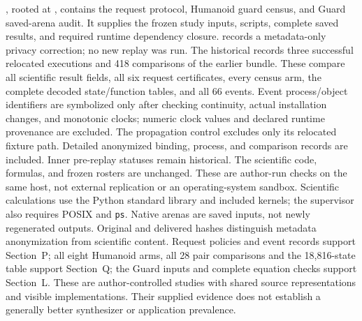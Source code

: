 , rooted at
, contains the request protocol,
Humanoid guard census, and Guard saved-arena audit. It supplies the
frozen study inputs, scripts, complete saved results, and required
runtime dependency closure.  records a
metadata-only privacy correction; no new replay was run. The historical
 records three successful relocated executions
and 418 comparisons of the earlier bundle. These compare all
scientific result fields, all six request certificates, every census arm,
the complete decoded state/function tables, and all 66 events. Event
process/object identifiers are symbolized only after checking continuity,
actual installation changes, and monotonic clocks; numeric clock values
and declared runtime provenance are excluded. The propagation control
excludes only its relocated fixture path. Detailed anonymized binding,
process, and comparison records are included. Inner pre-replay statuses
remain historical. The scientific code, formulas, and frozen rosters are
unchanged. These are author-run checks on the same host, not external
replication or an operating-system sandbox. Scientific calculations use
the Python standard library and included kernels; the supervisor also
requires POSIX and \texttt{ps}. Native arenas are saved inputs, not newly
regenerated outputs.
Original and delivered hashes distinguish metadata anonymization
from scientific content. Request policies and event records support
Section~P; all eight Humanoid arms, all 28 pair comparisons and the
18,816-state table support Section~Q; the Guard inputs and complete
equation checks support Section~L. These are author-controlled studies
with shared source representations and visible implementations.
Their supplied evidence does not establish a generally better
synthesizer or application prevalence.

